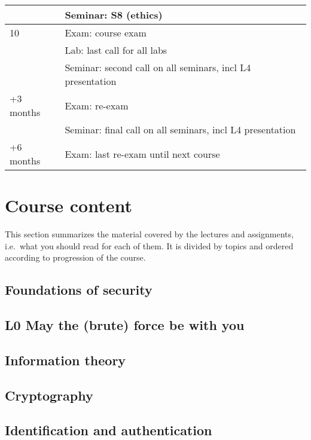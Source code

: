 \begin{table}
\begin{tabular}{lp{9cm}}
    & Seminar: S8 (ethics)\\
    \midrule
    10
    & Exam: course exam\\
    & Lab: last call for all labs\\
    & Seminar: second call on all seminars, incl L4 presentation\\
    \midrule
    +3 months
    & Exam: re-exam\\
    & Seminar: final call on all seminars, incl L4 presentation\\
    \midrule
    +6 months
    & Exam: last re-exam until next course\\
    \bottomrule
  \end{tabular}
\end{table}


\section{Course content}

This section summarizes the material covered by the lectures and assignments, 
i.e.\ what you should read for each of them.
It is divided by topics and ordered according to progression of the course.

\subsection{Foundations of security}


\subsection{L0 May the (brute) force be with you}


\subsection{Information theory}


\subsection{Cryptography}


\subsection{Identification and authentication}


